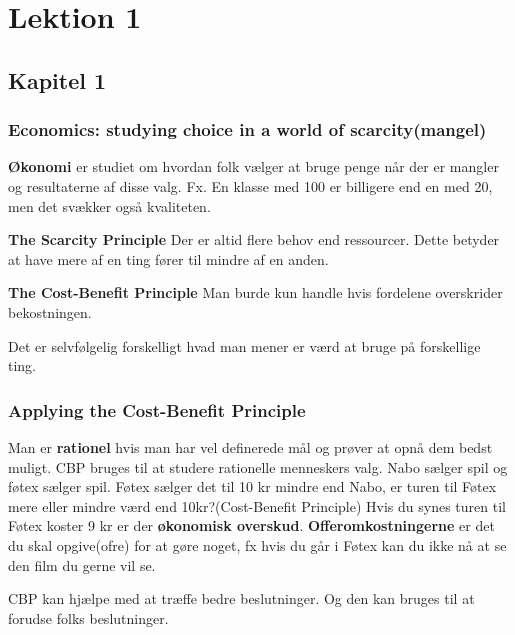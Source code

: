 \chapter{Lektion 1}
\section{Kapitel 1}
\subsection{Economics: studying choice in a world of scarcity(mangel)}
\textbf{Økonomi} er studiet om hvordan folk vælger at bruge penge når der er mangler og resultaterne af disse valg. Fx. En klasse med 100 er billigere end en med 20, men det svækker også kvaliteten. 
\begin{defn}\textbf{The Scarcity Principle} %
\newline
Der er altid flere behov end ressourcer. Dette betyder at have mere af en ting fører til mindre af en anden. 
\end{defn}
\begin{defn}\textbf{The Cost-Benefit Principle} %
\newline
Man burde kun handle hvis fordelene overskrider bekostningen.
\end{defn}
Det er selvfølgelig forskelligt hvad man mener er værd at bruge på forskellige ting. 

\subsection{Applying the Cost-Benefit Principle}
Man er \textbf{rationel} hvis man har vel definerede mål og prøver at opnå dem bedst muligt. CBP bruges til at studere rationelle menneskers valg. Nabo sælger spil og føtex sælger spil. Føtex sælger det til 10 kr mindre end Nabo, er turen til Føtex mere eller mindre værd end 10kr?(Cost-Benefit Principle) Hvis du synes turen til Føtex koster 9 kr er der \textbf{økonomisk overskud}. \textbf{Offeromkostningerne} er det du skal opgive(ofre) for at gøre noget, fx hvis du går i Føtex kan du ikke nå at se den film du gerne vil se. 

CBP kan hjælpe med at træffe bedre beslutninger. Og den kan bruges til at forudse folks beslutninger. 

